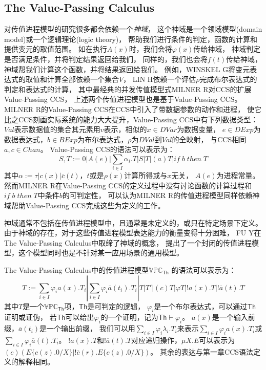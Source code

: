 \subsection{The Value-Passing Calculus}\label{ch:vpc}
对传值进程模型的研究很多都会依赖一个\textit{神域}，
这个神域是一个领域模型(domain model)或一个逻辑理论(logic theory)，
帮助我们进行条件的判定，函数的计算和提供变元的取值范围。
如在执行$A(x)$时，我们会将$\varphi(x)$传给神域，
神域判定是否满足条件，并将判定结果返回给我们，
同样的，我们也会将$f(t)$传给神域，神域帮我们计算这个函数，并将结果返回给我们。
例如，WINSKEL G将变元表达式的取值和计算全部依赖一个集合$V$\cite{Oracle_V}，
LIN H依赖一个评估$\rho$完成布尔表达式的判定和表达式的计算\cite{Oracle_rho}，
其中最经典的并发传值模型式MILNER R对CCS的扩展Value-Passing CCS\cite{Milner_CCS}，
上述两个传值进程模型也是基于Value-Passing CCS。 
MILNER R的Value-Passing CCS在CCS中引入了带数据参数的动作和进程，
使它比之CCS刻画实际系统的能力大大提升，Value-Passing CCS中有下列数据类型：
$Val$表示数据值的集合其元素用$v$表示，相似的$x\in DVar$为数据变量，
$e\in DExp$为数据表达式，$b\in BExp$为布尔表达式，$\rho$为$DVal$到$Val$的全映射，
与CCS相同$a,c\in Chan$。
Value-Passing CCS的语法可以表示为：
$$S,T:=0|A(e)|\sum_{i\in I}\alpha_i.T|S|T|(a)T|if\;b\;then\;T$$
其中$\alpha:=\tau|c(x)|\overline{c}(t)$，$t$或是$\rho(x)$计算所得或与$x$无关，
$A(e)$为进程常量\cite{VPCCS}。
然而MILNER R在Value-Passing CCS的定义过程中没有讨论函数的计算过程和$if\;b\;then\;T$中条件$b$的可判定性，
可以认为MILNER R的传值进程模型同样依赖神域帮助Value-Passing CCS完成这些为定义的工作。

神域通常不包括在传值进程模型中，且通常是未定义的，或只在特定场景下定义。
由于神域的存在，对于这些传值进程模型表达能力的衡量变得十分困难，
FU Y在The Value-Passing Calculus中取缔了神域的概念，
提出了一个封闭的传值进程模型\cite{Fu_VPC}，这个模型同时也是不针对某一应用场景的通用模型。

The Value-Passing Calculus中的传值进程模型$\mathbb{VPC}_{\mathsf{Th}}$
的语法可以表示为：
\begin{equation}\label{eq:vpc}
   T:=\sum_{i\in I}\varphi_i a(x).T_i|\sum_{i\in I}\varphi_i\overline{a}(t_i).T_i|T|T'|(c)T|\varphi T|!a(x).T|!\overline{a}(t).T
\end{equation}
其中$T$是一个$\mathbb{VPC}_{\mathsf{Th}}$项，$\mathsf{Th}$是可判定的逻辑，
$\varphi_i$是一个布尔表达式，可以通过$\mathsf{Th}$证明或证伪，
若$\mathsf{Th}$可以给出$\varphi_i$的一个证明，记为$\mathsf{Th}\vdash \varphi_i$。
$a(x)$是一个输入前缀，$\overline{a}(t_i)$是一个输出前缀，
我们可以用$\sum_{i\in I}\varphi_i\lambda_i.T_i$来表示$\sum_{i\in I}\varphi_i a(x).T_i$或$\sum_{i\in I}\varphi_i \overline{a}(t).T_i$。
$!a(x).T$和$!\overline{a}(t).T$对应递归操作，$\mu X.E$可以表示为
$(c)(E\{c(z).0/X\}|!\overline{c}(r).E\{c(z).0/X\})$。
其余的表达与第一章CCS语法定义的解释相同。

